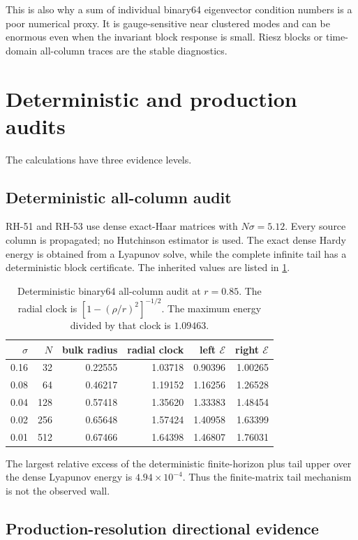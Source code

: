 \documentclass[11pt]{article}
\theoremstyle{remark}
\newcommand{\cE}{\mathcal E}
\begin{document}
This is also why a sum of individual binary64 eigenvector condition numbers
is a poor numerical proxy.  It is gauge-sensitive near clustered modes and
can be enormous even when the invariant block response is small.  Riesz
blocks or time-domain all-column traces are the stable diagnostics.

\section{Deterministic and production audits}

The calculations have three evidence levels.

\subsection{Deterministic all-column audit}

RH-51 and RH-53 use dense exact-Haar matrices with $N\sigma=5.12$.  Every
source column is propagated; no Hutchinson estimator is used.  The exact
dense Hardy energy is obtained from a Lyapunov solve, while the complete
infinite tail has a deterministic block certificate.  The inherited values
are listed in \cref{tab:all-column}.

\begin{table}[H]
\centering
\small
\begin{tabular}{rrrrrr}
\toprule
$\sigma$&$N$&bulk radius&radial clock&left $\cE$&right $\cE$\\
\midrule
0.16&32 &0.22555&1.03718&0.90396&1.00265\\
0.08&64 &0.46217&1.19152&1.16256&1.26528\\
0.04&128&0.57418&1.35620&1.33383&1.48454\\
0.02&256&0.65648&1.57424&1.40958&1.63399\\
0.01&512&0.67466&1.64398&1.46807&1.76031\\
\bottomrule
\end{tabular}
\caption{Deterministic binary64 all-column audit at $r=0.85$.  The radial
clock is $[1-(\rho/r)^2]^{-1/2}$.  The maximum energy divided by that clock
is $1.09463$.}
\label{tab:all-column}
\end{table}

The largest relative excess of the deterministic finite-horizon plus tail
upper over the dense Lyapunov energy is $4.94\times10^{-4}$.  Thus the
finite-matrix tail mechanism is not the observed wall.

\subsection{Production-resolution directional evidence}
\end{document}
